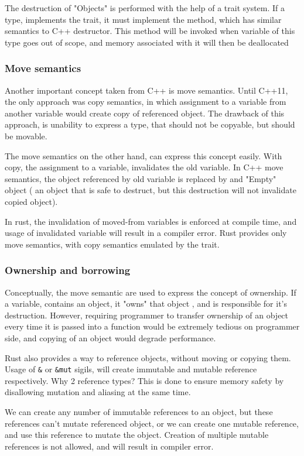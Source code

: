 The destruction of "Objects" is performed with the help of a trait system. If a type, implements the  trait,
it must implement the  method, which has similar semantics to C++ destructor. This method will be invoked
when variable of this type goes out of scope, and memory associated with it will then be deallocated

\subsubsection{Move semantics}
Another important concept taken from C++ is move semantics. Until C++11, the only approach was copy semantics, in which
assignment to a variable from another variable would create copy of referenced object.
The drawback of this approach, is unability to express a type, that should not be copyable, but should be movable.

The move semantics on the other hand, can express this concept easily. With copy, the assignment to a variable, invalidates the
old variable. In C++ move semantics, the object referenced by old variable is replaced by and "Empty" object ( an object
that is safe to destruct, but this destruction will not invalidate copied object).

In rust, the invalidation of moved-from variables is enforced at compile time, and usage of invalidated variable will result in a
compiler error. Rust provides only move semantics, with copy semantics emulated by the  trait.

\subsubsection{Ownership and borrowing}
Conceptually, the move semantic are used to express the concept of ownership. If a variable, contains an object, it "owns"
that object , and is responsible for it's destruction. However, requiring programmer to transfer ownership of an object every time
it is passed into a function would be extremely tedious on programmer side, and copying of an object would degrade performance.

Rust also provides a way to reference objects, without moving or copying them. Usage of \verb|&| or
\verb|&mut| sigils, will create immutable and mutable reference respectively. Why 2 reference types? This is
done to ensure memory safety by disallowing mutation and aliasing at the same time.

We can create any number of immutable references to an object, but these references can't mutate referenced object, or
we can create one mutable reference, and use this reference to mutate the object. Creation of multiple mutable references
is not allowed, and will result in compiler error.

